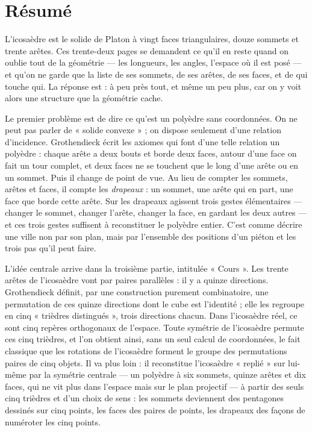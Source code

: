 \documentclass[11pt,a4paper]{article}
\begin{document}
\section*{Résumé}

\begin{resume}
L'icosaèdre est le solide de Platon à vingt faces triangulaires, douze sommets
et trente arêtes. Ces trente-deux pages se demandent ce qu'il en reste quand on
oublie tout de la géométrie --- les longueurs, les angles, l'espace où il est
posé --- et qu'on ne garde que la liste de ses sommets, de ses arêtes, de ses
faces, et de qui touche qui. La réponse est : à peu près tout, et même un peu
plus, car on y voit alors une structure que la géométrie cache.

Le premier problème est de dire ce qu'est un polyèdre sans coordonnées. On ne
peut pas parler de « solide convexe » ; on dispose seulement d'une relation
d'incidence. Grothendieck écrit les axiomes qui font d'une telle relation un
polyèdre : chaque arête a deux bouts et borde deux faces, autour d'une face on
fait un tour complet, et deux faces ne se touchent que le long d'une arête ou
en un sommet. Puis il change de point de vue. Au lieu de compter les sommets,
arêtes et faces, il compte les \emph{drapeaux} : un sommet, une arête qui en
part, une face que borde cette arête. Sur les drapeaux agissent trois gestes
élémentaires --- changer le sommet, changer l'arête, changer la face, en
gardant les deux autres --- et ces trois gestes suffisent à reconstituer le
polyèdre entier. C'est comme décrire une ville non par son plan, mais par
l'ensemble des positions d'un piéton et les trois pas qu'il peut faire.

L'idée centrale arrive dans la troisième partie, intitulée « Cours ». Les
trente arêtes de l'icosaèdre vont par paires parallèles : il y a quinze
directions. Grothendieck définit, par une construction purement combinatoire,
une permutation de ces quinze directions dont le cube est l'identité ; elle
les regroupe en cinq « trièdres distingués », trois directions chacun. Dans
l'icosaèdre réel, ce sont cinq repères orthogonaux de l'espace. Toute
symétrie de l'icosaèdre permute ces cinq trièdres, et l'on obtient ainsi,
sans un seul calcul de coordonnées, le fait classique que les rotations de
l'icosaèdre forment le groupe des permutations paires de cinq objets. Il va
plus loin : il reconstitue l'icosaèdre « replié » sur lui-même par la symétrie
centrale --- un polyèdre à six sommets, quinze arêtes et dix faces, qui ne
vit plus dans l'espace mais sur le plan projectif --- à partir des seuls cinq
trièdres et d'un choix de sens : les sommets deviennent des pentagones dessinés
sur cinq points, les faces des paires de points, les drapeaux des façons de
numéroter les cinq points.


\end{resume}
\end{document}
